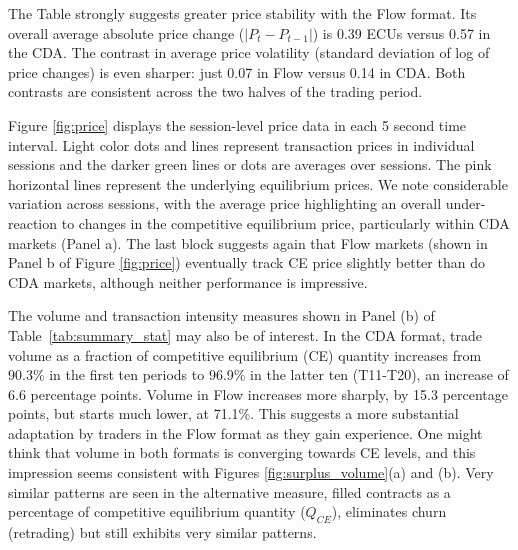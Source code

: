 The Table strongly suggests greater price stability with the Flow format. 
Its overall average absolute price change (\(|P_t - P_{t-1}|\)) is 0.39 ECUs versus 0.57 in the CDA.  %
The contrast in average price volatility (standard deviation of log of price changes) is even sharper:
just 0.07 in Flow versus 0.14 in CDA.
Both contrasts are consistent across the two halves of the trading period. %

Figure \ref{fig:price} displays the session-level price data in each 5 second time interval.  %
Light color dots and lines represent transaction prices in individual sessions and the darker green lines or dots are averages over sessions. The pink horizontal lines represent the underlying equilibrium prices. %
We note considerable variation across sessions, with the average price highlighting an overall under-reaction to changes in the competitive equilibrium price, particularly within CDA markets
(Panel a). The last block suggests again that Flow markets (shown in Panel b of Figure \ref{fig:price}) eventually track CE price slightly better than do CDA markets, although neither performance is impressive.

The volume and transaction intensity measures shown in Panel (b) of Table~\ref{tab:summary_stat}
may also be of interest.
In the CDA format, trade volume as a fraction of competitive equilibrium (CE) quantity increases from 90.3\% in the first ten periods to 96.9\% in the latter ten (T11-T20), an increase of 6.6 percentage points. Volume in Flow increases more sharply, by 15.3 percentage points, but starts much lower, at 71.1\%. %
This suggests a more substantial adaptation by traders in the Flow format as they gain experience. 
One might think that volume in both formats is converging towards CE levels, and this impression seems consistent with  Figures \ref{fig:surplus_volume}(a) and (b).
Very similar patterns are seen in 
the alternative measure, filled contracts as a percentage of competitive equilibrium quantity (\(Q_{CE}\)), eliminates churn (retrading) but still exhibits very similar patterns. 

